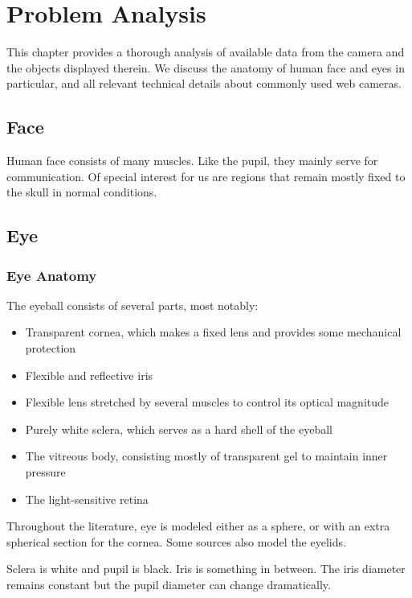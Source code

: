 \chapter{Problem Analysis}

This chapter provides a thorough analysis of available data from the camera and the objects displayed therein.
We discuss the anatomy of human face and eyes in particular, and all relevant technical details about commonly used web cameras.


\section{Face}

Human face consists of many muscles.
Like the pupil, they mainly serve for communication.
Of special interest for us are regions that remain mostly fixed to the skull in normal conditions.
\todo{\dots}

\section{Eye}
\subsection{Eye Anatomy}

The eyeball consists of several parts, most notably:
\begin{itemize}
\item Transparent cornea, which makes a fixed lens and provides some mechanical protection
\item Flexible and reflective iris
\item Flexible lens stretched by several muscles to control its optical magnitude
\item Purely white sclera, which serves as a hard shell of the eyeball
\item The vitreous body, consisting mostly of transparent gel to maintain inner pressure
\item The light-sensitive retina
\end{itemize}

Throughout the literature, eye is modeled either as a sphere, or with an extra spherical section for the cornea.
Some sources also model the eyelids.

Sclera is white and pupil is black.
Iris is something in between.
The iris diameter remains constant but the pupil diameter can change dramatically.

